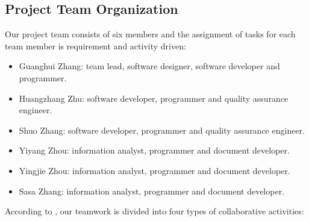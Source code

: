 \documentclass[12pt]{article}
\begin{document}
\subsection{Project Team Organization}
Our project team consists of six members and the assignment of tasks for each team member is requirement and activity driven:
\begin{itemize}
    \item Guanghui Zhang:  team lead, software designer, software developer and programmer.
    \item Huangzhang Zhu: software developer, programmer and quality assurance engineer.
    \item Shuo Zhang: software developer, programmer and quality assurance engineer.
    \item Yiyang Zhou: information analyst, programmer and document developer.
    \item Yingjie Zhou: information analyst, programmer and document developer.
    \item Sasa Zhang: information analyst, programmer and document developer.
\end{itemize}
According to \cite{robillard2000types}, our teamwork is divided into four types of collaborative activities:
\end{document}
